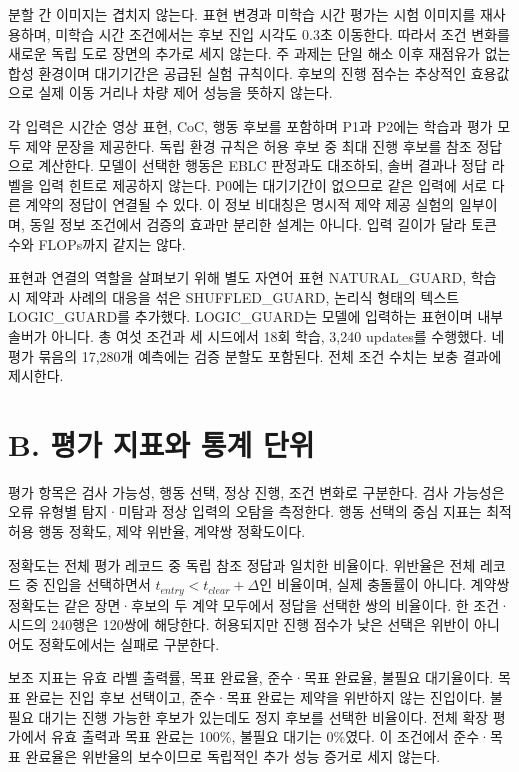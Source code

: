 \documentclass[11pt,a4paper]{article}
\begin{document}
분할 간 이미지는 겹치지 않는다. 표현 변경과 미학습 시간 평가는 시험 이미지를 재사용하며, 미학습 시간 조건에서는 후보 진입 시각도 0.3초 이동한다. 따라서 조건 변화를 새로운 독립 도로 장면의 추가로 세지 않는다. 주 과제는 단일 해소 이후 재점유가 없는 합성 환경이며 대기기간은 공급된 실험 규칙이다. 후보의 진행 점수는 추상적인 효용값으로 실제 이동 거리나 차량 제어 성능을 뜻하지 않는다.\par

각 입력은 시간순 영상 표현, CoC, 행동 후보를 포함하며 P1과 P2에는 학습과 평가 모두 제약 문장을 제공한다. 독립 환경 규칙은 허용 후보 중 최대 진행 후보를 참조 정답으로 계산한다. 모델이 선택한 행동은 EBLC 판정과도 대조하되, 솔버 결과나 정답 라벨을 입력 힌트로 제공하지 않는다. P0에는 대기기간이 없으므로 같은 입력에 서로 다른 계약의 정답이 연결될 수 있다. 이 정보 비대칭은 명시적 제약 제공 실험의 일부이며, 동일 정보 조건에서 검증의 효과만 분리한 설계는 아니다. 입력 길이가 달라 토큰 수와 FLOPs까지 같지는 않다.\par

표현과 연결의 역할을 살펴보기 위해 별도 자연어 표현 NATURAL\_GUARD, 학습 시 제약과 사례의 대응을 섞은 SHUFFLED\_GUARD, 논리식 형태의 텍스트 LOGIC\_GUARD를 추가했다. LOGIC\_GUARD는 모델에 입력하는 표현이며 내부 솔버가 아니다. 총 여섯 조건과 세 시드에서 18회 학습, 3,240 updates를 수행했다. 네 평가 묶음의 17,280개 예측에는 검증 분할도 포함된다. 전체 조건 수치는 보충 결과에 제시한다.\par

\section*{B. 평가 지표와 통계 단위}

평가 항목은 검사 가능성, 행동 선택, 정상 진행, 조건 변화로 구분한다. 검사 가능성은 오류 유형별 탐지·미탐과 정상 입력의 오탐을 측정한다. 행동 선택의 중심 지표는 최적 허용 행동 정확도, 제약 위반율, 계약쌍 정확도이다.\par

정확도는 전체 평가 레코드 중 독립 참조 정답과 일치한 비율이다. 위반율은 전체 레코드 중 진입을 선택하면서 \(t_{entry}<t_{clear}+\Delta\)인 비율이며, 실제 충돌률이 아니다. 계약쌍 정확도는 같은 장면·후보의 두 계약 모두에서 정답을 선택한 쌍의 비율이다. 한 조건·시드의 240행은 120쌍에 해당한다. 허용되지만 진행 점수가 낮은 선택은 위반이 아니어도 정확도에서는 실패로 구분한다.\par

보조 지표는 유효 라벨 출력률, 목표 완료율, 준수·목표 완료율, 불필요 대기율이다. 목표 완료는 진입 후보 선택이고, 준수·목표 완료는 제약을 위반하지 않는 진입이다. 불필요 대기는 진행 가능한 후보가 있는데도 정지 후보를 선택한 비율이다. 전체 확장 평가에서 유효 출력과 목표 완료는 100\%, 불필요 대기는 0\%였다. 이 조건에서 준수·목표 완료율은 위반율의 보수이므로 독립적인 추가 성능 증거로 세지 않는다.\par
\end{document}
